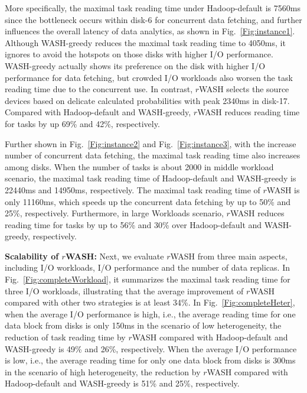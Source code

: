 \documentclass[conference]{IEEEtran}
\begin{document}
More specifically, the maximal task reading time under Hadoop-default is 7560ms since the bottleneck occurs within disk-6 for concurrent data fetching, and further influences the overall latency of data analytics, as shown in Fig.~\ref{Fig:instance1}. Although WASH-greedy reduces the maximal task reading time to 4050ms, it ignores to avoid the hotspots on those disks with higher I/O performance. WASH-greedy actually shows its preference on the disk with higher I/O performance for data fetching, but crowded I/O workloads also worsen the task reading time due to the concurrent use. In contrast, $r$WASH selects the source devices based on delicate calculated probabilities with peak 2340ms in disk-17. 
Compared with Hadoop-default and WASH-greedy, $r$WASH reduces reading time for tasks by up 69\% and 42\%, respectively.   

Further shown in Fig.~\ref{Fig:instance2} and Fig.~\ref{Fig:instance3}, with the increase number of concurrent data fetching, the maximal task reading time also increases among disks. When the number of tasks is about 2000 in middle workload scenario, the maximal task reading time of 
Hadoop-default and WASH-greedy is 22440ms and 14950ms, respectively. The maximal task reading time of $r$WASH is only 11160ms, which speeds up the concurrent data fetching by up to 50\% and 25\%, respectively. 
Furthermore, in large Workloads scenario, $r$WASH reduces reading time for tasks by up to 56\% and 30\% over Hadoop-default and WASH-greedy, respectively. 


\textbf{Scalability of $r$WASH:} Next, we evaluate $r$WASH from three main aspects, including I/O workloads, I/O performance and the number of data replicas. In Fig.~\ref{Fig:completeWorkload}, it summarizes the maximal task reading time for three I/O workloads, illustrating that the average improvement of $r$WASH compared with other two strategies is at least 34\%. In Fig.~\ref{Fig:completeHeter}, when the average I/O performance is high, i.e., the average reading time for one data block from disks is only 150ms in the scenario of low heterogeneity, the reduction of task reading time by $r$WASH compared with Hadoop-default and WASH-greedy is 49\% and 26\%, respectively. When the average I/O performance is low, i.e., the average reading time for only one data block from disks is 300ms in the scenario of high heterogeneity, the reduction by $r$WASH compared with Hadoop-default and WASH-greedy is 51\% and 25\%, respectively.
\end{document}
